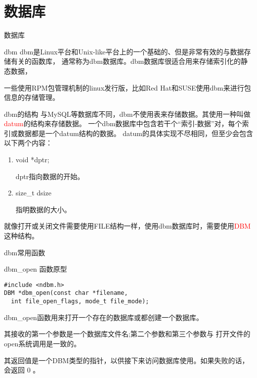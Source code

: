 \documentclass{beamer}
\begin{document}
\section{数据库}
\begin{frame}
\Huge{\centerline{数据库}}
\end{frame}
\begin{frame}{dbm}
dbm是Linux平台和Unix-like平台上的一个基础的、但是非常有效的与数据存储有关的函数库，
通常称为dbm数据库。dbm数据库很适合用来存储索引化的静态数据，

一些使用RPM包管理机制的linux发行版，比如Red Hat和SUSE使用dbm来进行包信息的存储管理。

\end{frame}
\begin{frame}{dbm的结构}
与MySQL等数据库不同，dbm不使用表来存储数据。其使用一种叫做\textcolor{red}{datum}的结构来存储数据。
一个dbm数据库中包含若干个“索引-数据”对，每个索引或数据都是一个datum结构的数据。
datum的具体实现不尽相同，但至少会包含以下两个内容：
\begin{enumerate}
\item
void *dptr;

dptr指向数据的开始。
\item
size\_t dsize

指明数据的大小。
\end{enumerate}
就像打开或关闭文件需要使用FILE结构一样，使用dbm数据库时，需要使用\textcolor{red}{DBM}这种结构。
\end{frame}
\begin{frame}[fragile]{dbm常用函数}
\begin{block}{dbm\_open 函数原型}
\begin{lstlisting}
#include <ndbm.h>
DBM *dbm_open(const char *filename, 
  int file_open_flags, mode_t file_mode);
\end{lstlisting}
\end{block}
dbm\_open函数用来打开一个存在的数据库或都创建一个数据库。

其接收的第一个参数是一个数据库文件名;第二个参数和第三个参数与
打开文件的open系统调用是一致的。

其返回值是一个DBM类型的指针，以供接下来访问数据库使用。如果失败的话，会返回
0 。
\end{frame}
\end{document}

